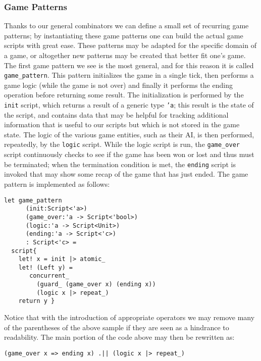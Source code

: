 \subsubsection{Game Patterns}

Thanks to our general combinators we can define a small set of recurring game patterns; by instantiating these game patterns one can build the actual game scripts with great ease. These patterns may be adapted for the specific domain of a game, or altogether new patterns may be created that better fit one's game. 
The first game pattern we see is the most general, and for this reason it is called \texttt{game\_pattern}. This pattern initializes the game in a single tick, then performs a game logic (while the game is not over) and finally it performs the ending operation before returning some result. The initialization is performed by the \texttt{init} script, which returns a result of a generic type \texttt{'a}; this result is the state of the script, and contains data that may be helpful for tracking additional information that is useful to our scripts but which is not stored in the game state. The logic of the various game entities, such as their AI, is then performed, repeatedly, by the \texttt{logic} script. While the logic script is run, the \texttt{game\_over} script continuously checks to see if the game has been won or lost and thus must be terminated; when the termination condition is met, the \texttt{ending} script is invoked that may show some recap of the game that has just ended. The game pattern is implemented as follows:

\begin{lstlisting}
let game_pattern 
      (init:Script<'a>) 
      (game_over:'a -> Script<'bool>) 
      (logic:'a -> Script<Unit>) 
      (ending:'a -> Script<'c>) 
      : Script<'c> =
  script{
    let! x = init |> atomic_
    let! (Left y) = 
       concurrent_ 
         (guard_ (game_over x) (ending x)) 
         (logic x |> repeat_)
    return y }
\end{lstlisting}

Notice that with the introduction of appropriate operators we may remove many of the parentheses of the above sample if they are seen as a hindrance to readability. The main portion of the code above may then be rewritten as:

\begin{lstlisting}
(game_over x => ending x) .|| (logic x |> repeat_)
\end{lstlisting}

